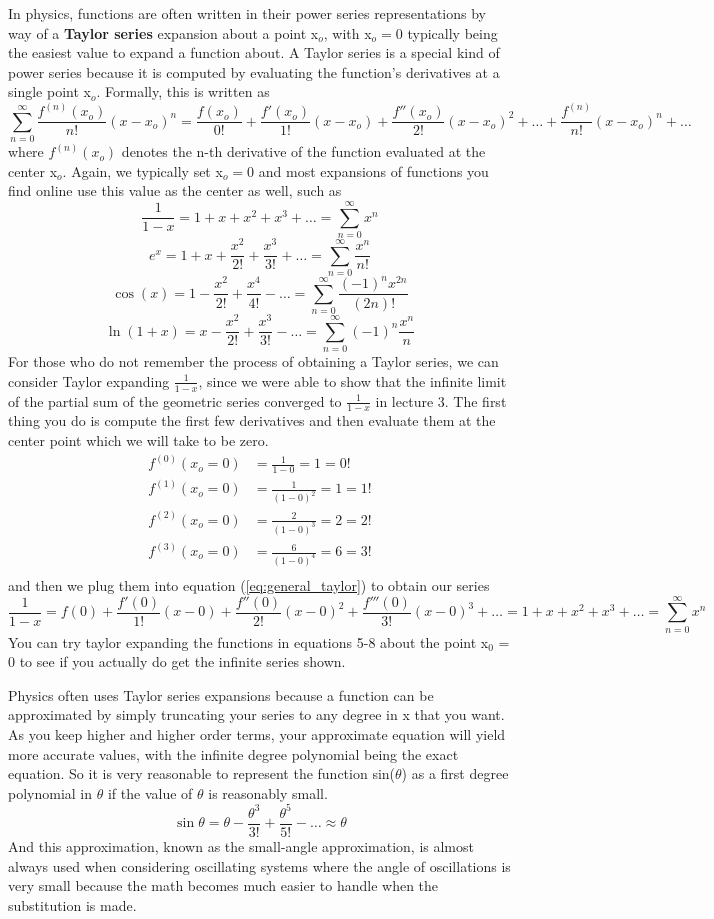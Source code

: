 \documentclass{article}
\newcommand{\be}{\begin{equation}}
\newcommand{\ee}{\end{equation}}
\newcommand{\sumzero}{\sum_{n=0}^\infty}
\begin{document}
In physics, functions are often written in their power series representations by way of a \textbf{Taylor series} expansion about a point x$_o$, with x$_o = 0$ typically being the easiest value to expand a function about.
A Taylor series is a special kind of power series because it is computed by evaluating the function's derivatives at a single point x$_o$.
Formally, this is written as
\be \label{eq:general_taylor}
\sumzero \frac{f^{(n)} (x_o)} {n!} (x - x_o)^n = \frac{f(x_o)}{0!} + \frac{f'(x_o)}{1!} (x - x_o) + \frac{f''(x_o)}{2!} (x - x_o)^2 + \hdots + \frac{ f^{(n)} }{n!}(x - x_o)^n + \hdots
\ee
where $f^{(n)} (x_o)$ denotes the n-th derivative of the function evaluated at the center x$_o$.
Again, we typically set x$_o = 0$ and most expansions of functions you find online use this value as the center as well, such as
\be
\frac{1}{1-x} = 1 + x + x^2 + x^3 + \hdots = \sumzero x^n
\ee
\be
e^x = 1 + x + \frac{x^2}{2!} + \frac{x^3}{3!} + \hdots = \sumzero \frac{x^n}{n!}
\ee
\be
\cos(x) = 1 - \frac{x^2}{2!} + \frac{x^4}{4!} - \hdots = \sumzero \frac{(-1)^n x^{2n}}{(2n)!}
\ee
\be
\ln(1+x) = x - \frac{x^2}{2!} + \frac{x^3}{3!} - \hdots = \sumzero (-1)^{n} \frac{x^n}{n}
\ee
For those who do not remember the process of obtaining a Taylor series, we can consider Taylor expanding $\frac{1}{1 - x}$, since we were able to show that the infinite limit of the partial sum of the geometric series converged to $\frac{1}{1-x}$ in lecture 3.
The first thing you do is compute the first few derivatives and then evaluate them at the center point which we will take to be zero.
\be
\begin{split}
f^{(0)} (x_o = 0) &= \frac{1}{1-0} = 1 = 0!\\
f^{(1)} (x_o = 0) &= \frac{1}{(1-0)^2} = 1 = 1!\\
f^{(2)} (x_o = 0) &= \frac{2}{(1-0)^3} = 2 = 2!\\
f^{(3)} (x_o = 0) &= \frac{6}{(1-0)^4} = 6 = 3!\\
\end{split}
\ee
and then we plug them into equation (\ref{eq:general_taylor}) to obtain our series
\be
\frac{1}{1-x} = f(0) + \frac{f'(0)}{1!} (x - 0) + \frac{f''(0)}{2!} (x - 0)^2 + \frac{f'''(0)}{3!} (x - 0)^3 + \hdots = 1 + x + x^2 + x^3 + \hdots = \sumzero x^n
\ee
You can try taylor expanding the functions in equations 5-8 about the point x$_0$ = 0 to see if you actually do get the infinite series shown.

Physics often uses Taylor series expansions because a function can be approximated by simply truncating your series to any degree in x that you want.
As you keep higher and higher order terms, your approximate equation will yield more accurate values, with the infinite degree polynomial being the exact equation.
So it is very reasonable to represent the function sin($\theta$) as a first degree polynomial in $\theta$ if the value of $\theta$ is reasonably small.
\be
\sin{\theta} = \theta - \frac{\theta^3}{3!} + \frac{\theta^5}{5!} - \hdots \approx \theta
\ee
And this approximation, known as the small-angle approximation, is almost always used when considering oscillating systems where the angle of oscillations is very small because the math becomes much easier to handle when the substitution is made.
\end{document}
